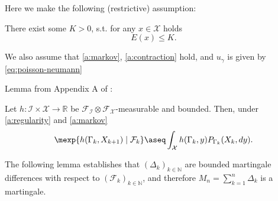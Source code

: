 Here we make the following (restrictive) assumption:
\begin{assumption}
\label{a:eccentricity}
There exist some $K > 0$, s.t. for any $x \in \mathcal{X}$ holds
\[
E(x) \leq K.
\]
\end{assumption}

We also assume that \ref{a:markov}, \ref{a:contraction} hold, and $u_\gamma$ is given by \eqref{eq:poisson-neumann}

Lemma from Appendix A of \cite{laitinen2024invitationadaptivemarkovchain}:
\begin{lemma}
\label{lem:h-measurable}
Let $h:\mathcal{I} \times \mathcal{X} \to \mathbb{R}$ be $\mathcal{F}_{\mathcal{I}}\otimes\mathcal{F}_{\mathcal{X}}$-measurable and bounded. Then, under \ref{a:regularity} and \ref{a:markov}
\[
  \mexp{h(\Gamma_k, X_{k+1})\mid \mathcal{F}_k} \aseq \int_{\mathcal{X}} h(\Gamma_k, y) P_{\Gamma_k}(X_k, dy) .
\]
\end{lemma}

The following lemma establishes that $(\Delta_k)_{k \in \mathbb{N}}$ are bounded martingale differences with respect to $(\mathcal{F}_k)_{k \in \mathbb{N}}$, and therefore $M_n = \sum_{k=1}^n \Delta_k$ is a martingale. 

